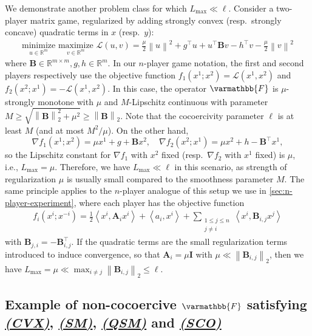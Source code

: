 \documentclass{article}
\newcommand{\vA}{{\mathbf{A}}}
\newcommand{\vB}{{\mathbf{B}}}
\newcommand{\vI}{{\mathbf{I}}}
\newcommand{\cL}{{\mathcal{L}}}
\newcommand{\reals}{\mathbb{R}}
\newcommand{\opF}{{\varmathbb{F}}}
\newcommand{\inprod}[2]{\left\langle #1,#2 \right\rangle}
\newcommand{\sqnorm}[1]{\left\| #1 \right\|^2}
\newcommand{\norm}[1]{\left\|#1\right\|}
\theoremstyle{plain}
\theoremstyle{remark}
\begin{document}
We demonstrate another problem class for which $L_{\mathrm{max}} \ll \ell$.
Consider a two-player matrix game, regularized by adding strongly convex (resp.\ strongly concave) quadratic terms in $x$ (resp.\ $y$):
\begin{align}
\label{eqn:quadratic-minimax-game}
    \underset{u \in \reals^m}{\textrm{minimize}} \,\, \underset{v \in \reals^m}{\textrm{maximize}} \,\, \cL(u,v) = \frac{\mu}{2} \sqnorm{u} + g^\intercal u + u^\intercal \vB v - h^\intercal v - \frac{\mu}{2} \sqnorm{v}
\end{align}
where $\vB \in \reals^{m\times m}, g,h \in \reals^m$.
In our $n$-player game notation, the first and second players respectively use the objective function $f_1(x^1;x^2) = \cL(x^1,x^2)$ and $f_2(x^2;x^1) = -\cL(x^1,x^2)$.
In this case, the operator $\opF$ is $\mu$-strongly monotone with $\mu$ and $M$-Lipschitz continuous with parameter $M \ge \sqrt{\norm{\vB}_2^2 + \mu^2} \ge \norm{\vB}_2$.
Note that the cocoercivity parameter $\ell$ is at least $M$ (and at most $M^2/\mu$).
On the other hand, 
\[
    \nabla f_1 (x^1;x^2) = \mu x^1 + g + \vB x^2, \quad \nabla f_2 (x^2;x^1) = \mu x^2 + h - \vB^\intercal x^1 ,
\]
so the Lipschitz constant for $\nabla f_1$ with $x^2$ fixed (resp.\ $\nabla f_2$ with $x^1$ fixed) is $\mu$, i.e., $L_{\mathrm{max}} = \mu$.
Therefore, we have $L_{\mathrm{max}} \ll \ell$ in this scenario, as strength of regularization $\mu$ is usually small compared to the smoothness parameter $M$.
The same principle applies to the $n$-player analogue of this setup we use in \cref{sec:n-player-experiment}, where each player has the objective function
\begin{align*}
    f_i (x^i; x^{-i}) = \frac{1}{2} \inprod{x^i}{\vA_i x^i} +  \inprod{a_i}{x^i} + \sum_{\substack{1\le j \le n \\ j \ne i}} \inprod{x^i}{\vB_{i,j} x^j} 
\end{align*}
with $\vB_{j,i} = -\vB_{i,j}^\intercal$.
If the quadratic terms are the small regularization terms introduced to induce convergence, so that $\vA_i = \mu\vI$ with $\mu \ll \norm{\vB_{i,j}}_2$, then we have $L_{\mathrm{max}} = \mu \ll \max_{i\ne j} \norm{\vB_{i,j}}_2 \le \ell$.


\subsection{Example of non-cocoercive $\opF$ satisfying \hyperref[assumption:convexity]{\textbf{\emph{(CVX)}}}, \hyperref[assumption:smoothness]{\textbf{\emph{(SM)}}}, \hyperref[assumption:quasi-strong-monotonicity]{\textbf{\emph{(QSM)}}} and \hyperref[assumption:star-cocoercivity]{\textbf{\emph{(SCO)}}}}
\label{section:non-cocoercive-example}
\end{document}

